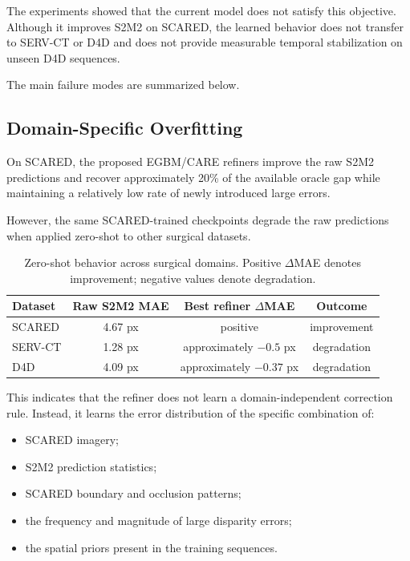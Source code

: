 \documentclass[11pt,a4paper]{article}
\begin{document}
The experiments showed that the current model does not satisfy this objective.
Although it improves S2M2 on SCARED, the learned behavior does not transfer to
SERV-CT or D4D and does not provide measurable temporal stabilization on unseen
D4D sequences.

The main failure modes are summarized below.

\subsection{Domain-Specific Overfitting}

On SCARED, the proposed EGBM/CARE refiners improve the raw S2M2 predictions and
recover approximately 20\% of the available oracle gap while maintaining a
relatively low rate of newly introduced large errors.

However, the same SCARED-trained checkpoints degrade the raw predictions when
applied zero-shot to other surgical datasets.

\begin{table}[h]
\centering
\caption{Zero-shot behavior across surgical domains. Positive $\Delta$MAE denotes
improvement; negative values denote degradation.}
\small
\begin{tabular}{lccc}
\toprule
\textbf{Dataset}
& \textbf{Raw S2M2 MAE}
& \textbf{Best refiner $\Delta$MAE}
& \textbf{Outcome} \\
\midrule
SCARED
& 4.67 px
& positive
& improvement \\

SERV-CT
& 1.28 px
& approximately $-0.5$ px
& degradation \\

D4D
& 4.09 px
& approximately $-0.37$ px
& degradation \\
\bottomrule
\end{tabular}
\end{table}

This indicates that the refiner does not learn a domain-independent correction
rule. Instead, it learns the error distribution of the specific combination of:

\begin{itemize}[leftmargin=*]
    \item SCARED imagery;
    \item S2M2 prediction statistics;
    \item SCARED boundary and occlusion patterns;
    \item the frequency and magnitude of large disparity errors;
    \item the spatial priors present in the training sequences.
\end{itemize}
\end{document}
